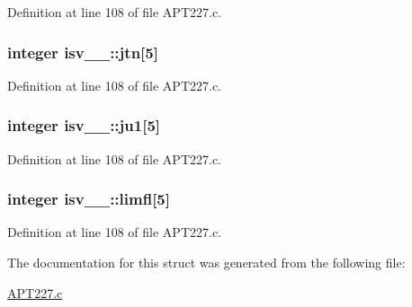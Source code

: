 Definition at line 108 of file A\+P\+T227.\+c.

\subsubsection[{\texorpdfstring{jtn}{jtn}}]{\setlength{\rightskip}{0pt plus 5cm}integer isv\+\_\+\_\+\+::jtn\mbox{[}5\mbox{]}}\hypertarget{structisv__1___a66b5b3eec6b7ea801a28a0e88a7b594b}{}\label{structisv__1___a66b5b3eec6b7ea801a28a0e88a7b594b}


Definition at line 108 of file A\+P\+T227.\+c.

\subsubsection[{\texorpdfstring{ju1}{ju1}}]{\setlength{\rightskip}{0pt plus 5cm}integer isv\+\_\+\_\+\+::ju1\mbox{[}5\mbox{]}}\hypertarget{structisv__1___a443c1899c30db617c5b6c44ca58bf9e6}{}\label{structisv__1___a443c1899c30db617c5b6c44ca58bf9e6}


Definition at line 108 of file A\+P\+T227.\+c.

\subsubsection[{\texorpdfstring{limfl}{limfl}}]{\setlength{\rightskip}{0pt plus 5cm}integer isv\+\_\+\_\+\+::limfl\mbox{[}5\mbox{]}}\hypertarget{structisv__1___ac45ae21b619df183c8845fcc1746d371}{}\label{structisv__1___ac45ae21b619df183c8845fcc1746d371}


Definition at line 108 of file A\+P\+T227.\+c.



The documentation for this struct was generated from the following file\+:\begin{DoxyCompactItemize}
\item 
\hyperlink{APT227_8c}{A\+P\+T227.\+c}\end{DoxyCompactItemize}
